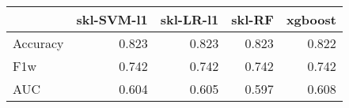 \begin{tabular}{lrrrr}
\toprule
{} &  skl-SVM-l1 &  skl-LR-l1 &  skl-RF &  xgboost \\
\midrule
Accuracy &       0.823 &      0.823 &   0.823 &    0.822 \\
F1w      &       0.742 &      0.742 &   0.742 &    0.742 \\
AUC      &       0.604 &      0.605 &   0.597 &    0.608 \\
\bottomrule
\end{tabular}
